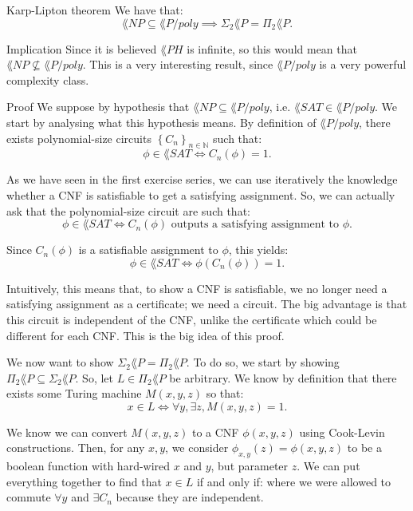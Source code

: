 \documentclass[a4paper]{article}
\begin{document}
\begin{parag}{Karp-Lipton theorem}
    We have that: 
    \[\lang{NP} \subseteq \lang{P/poly} \implies \Sigma_2 \lang{P} = \Pi_2 \lang{P}.\]
    
    \begin{subparag}{Implication}
        Since it is believed $\lang{PH}$ is infinite, so this would mean that $\lang{NP} \not\subseteq \lang{P/poly}$. This is a very interesting result, since $\lang{P/poly}$ is a very powerful complexity class.
    \end{subparag}

    \begin{subparag}{Proof}
        We suppose by hypothesis that $\lang{NP} \subseteq \lang{P / poly}$, i.e. $\lang{SAT} \in \lang{P / poly}$. We start by analysing what this hypothesis means. By definition of $\lang{P/poly}$, there exists polynomial-size circuits $\left\{C_n\right\}_{n \in \mathbb{N}}$ such that: 
        \[\phi \in \lang{SAT} \iff C_n\left(\phi\right) = 1.\]

        As we have seen in the first exercise series, we can use iteratively the knowledge whether a CNF is satisfiable to get a satisfying assignment. So, we can actually ask that the polynomial-size circuit are such that: 
        \[\phi \in \lang{SAT} \iff C_n\left(\phi\right) \text{ outputs a satisfying assignment to $\phi$}.\]
        

        Since $C_n\left(\phi\right)$ is a satisfiable assignment to $\phi$, this yields: 
        \[\phi \in \lang{SAT} \iff \phi\left(C_n\left(\phi\right)\right) = 1.\]

        Intuitively, this means that, to show a CNF is satisfiable, we no longer need a satisfying assignment as a certificate; we need a circuit. The big advantage is that this circuit is independent of the CNF, unlike the certificate which could be different for each CNF. This is the big idea of this proof.

        We now want to show $\Sigma_2 \lang{P} = \Pi_2 \lang{P}$. To do so, we start by showing $\Pi_2 \lang{P} \subseteq \Sigma_2 \lang{P}$. So, let $L \in \Pi_2 \lang{P}$ be arbitrary. We know by definition that there exists some Turing machine $M\left(x, y, z\right)$ so that: 
        \[x \in L \iff \forall y, \exists z, M\left(x, y, z\right) = 1.\]

        We know we can convert $M\left(x, y, z\right)$ to a CNF $\phi\left(x, y, z\right)$ using Cook-Levin constructions. Then, for any $x, y$, we consider $\phi_{x, y}\left(z\right) = \phi\left(x, y, z\right)$ to be a boolean function with hard-wired $x$ and $y$, but parameter $z$. We can put everything together to find that $x \in L$ if and only if:
        where we were allowed to commute $\forall y$ and $\exists C_n$ because they are independent.


\end{subparag}
\end{parag}
\end{document}
